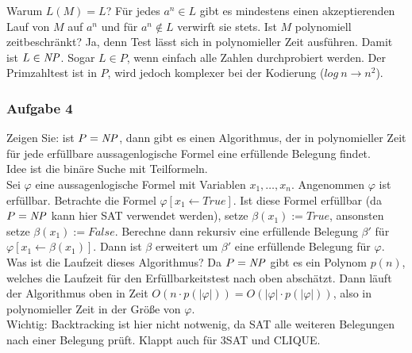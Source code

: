     Warum $L(M) = L$? Für jedes $a^{n} \in L$ gibt es mindestens einen akzeptierenden Lauf von $M$ auf $a^{n}$ und für $a^{n} \not\in L$ verwirft sie stets.
    Ist $M$ polynomiell zeitbeschränkt? Ja, denn Test lässt sich in polynomieller Zeit ausführen. Damit ist $L \in \mathit{NP}$. Sogar $L \in P$, wenn einfach alle Zahlen durchprobiert werden.
    Der Primzahltest ist in $P$, wird jedoch komplexer bei der Kodierung ($log\ n \to n^{2}$).


\subsubsection*{Aufgabe 4}
    Zeigen Sie: ist $P = \mathit{NP}$, dann gibt es einen Algorithmus, der in polynomieller Zeit für jede erfüllbare aussagenlogische Formel eine erfüllende Belegung findet. \\

    \LOES Idee ist die binäre Suche mit Teilformeln. \\
    Sei $\varphi$ eine aussagenlogische Formel mit Variablen $x_{1}, \dots, x_{n}$. Angenommen $\varphi$ ist erfüllbar. Betrachte die Formel $\varphi [x_{1} \leftarrow True ]$. Ist diese Formel erfüllbar (da $P = \mathit{NP}$ kann hier SAT verwendet werden), setze $\beta(x_{1}) := True$, ansonsten setze $\beta(x_{1}) := False$. Berechne dann rekursiv eine erfüllende Belegung $\beta'$ für $\varphi [x_{1} \leftarrow \beta(x_{1})]$. Dann ist $\beta$ erweitert um $\beta'$ eine erfüllende Belegung für $\varphi$. \\

    Was ist die Laufzeit dieses Algorithmus? Da $P = \mathit{NP}$ gibt es ein Polynom $p(n)$, welches die Laufzeit für den Erfüllbarkeitstest nach oben abschätzt. Dann läuft der Algorithmus oben in Zeit $O(n \cdot p(|\varphi|)) = O(|\varphi| \cdot p(|\varphi|))$, also in polynomieller Zeit in der Größe von $\varphi$. \\

    Wichtig: Backtracking ist hier nicht notwenig, da SAT alle weiteren Belegungen nach einer Belegung prüft.
    Klappt auch für 3SAT und CLIQUE.
